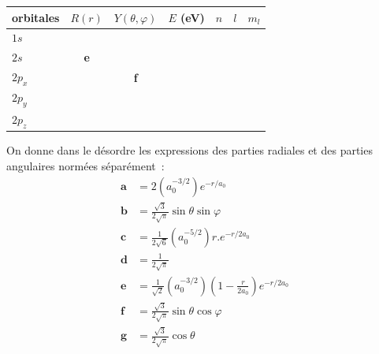 \begin{center}
\begin{tabular}{|l|c|c|c|c|c| c|}\hline
orbitales & $R(r)$ & $Y(\theta,\varphi)$ & $E$ (eV) & $n$ & $l$ &  $m_l$\\\hline
$1s$   &           &                     & & & &\\\hline
$2s$   & \textbf{e}&                     & & & &\\\hline
$2p_x$ &           & \textbf{f}          & & & &\cellcolor{gray} \\\hline
$2p_y$ &           &                     & & & &\cellcolor{gray}\\\hline
$2p_z$ &           &                     & & & &\\\hline
\end{tabular}
\end{center}

On donne dans le d\'esordre les expressions des parties radiales et des parties angulaires norm\'ees s\'epar\'ement~:\\
\begin{align*}
\textbf{a}&=2\left(a_0^{-3/2}\right)e^{-r/a_0} \\
\textbf{b}&=\frac{\sqrt{3}}{2\sqrt{\pi}}\sin{\theta}\sin{\varphi} \\
\textbf{c}&=\frac{1}{2\sqrt{6}}\left(a_0^{-5/2}\right)r.e^{-r/2a_0} \\
\textbf{d}&=\frac{1}{2\sqrt{\pi}} \\
\textbf{e}&=\frac{1}{\sqrt{2}}\left(a_0^{-3/2}\right)\left(1-\frac{r}{2a_0}\right)e^{-r/2a_0} \\
\textbf{f}&=\frac{\sqrt{3}}{2\sqrt{\pi}}\sin{\theta}\cos{\varphi} \\
\textbf{g}&=\frac{\sqrt{3}}{2\sqrt{\pi}}\cos{\theta}
\end{align*}

